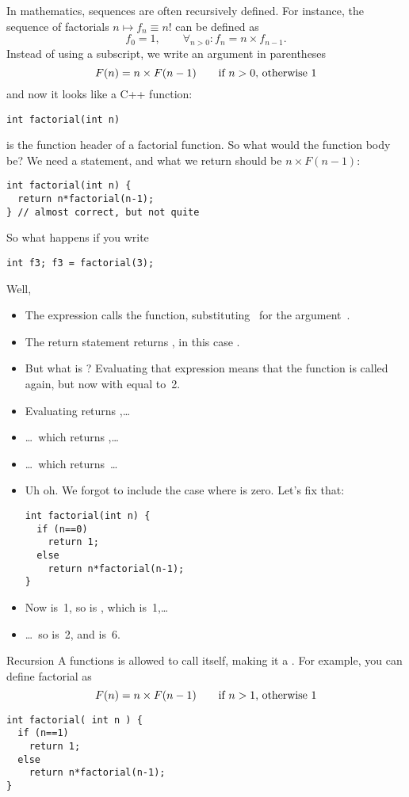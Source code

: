 In mathematics, sequences are often recursively defined. For instance,
the sequence of factorials $n\mapsto f_n\equiv n!$ can be defined as
\[ f_0=1,\qquad \forall_{n>0}\colon f_n=n\times f_{n-1}. \]
Instead of using a subscript, we write an argument in parentheses
\[ F(n) = n \times F(n-1) \qquad \hbox{if $n>0$, otherwise~$1$} \]
and now it looks like a C++ function:
\begin{verbatim}
int factorial(int n)
\end{verbatim}
is the function header of a factorial function. So what would the
function body be? We need a  statement, and what we return
should be $n \times F(n-1)$:
\begin{verbatim}
int factorial(int n) {
  return n*factorial(n-1);
} // almost correct, but not quite
\end{verbatim}
So what happens if you write
\begin{verbatim}
int f3; f3 = factorial(3);
\end{verbatim}
Well,
\begin{itemize}
\item The expression  calls the 
  function, substituting~ for the argument~.
\item The return statement returns , in this case
  .
\item But what is ? Evaluating that expression means
  that the  function is called again, but now with 
  equal to~2.
\item Evaluating  returns ,\ldots
\item \ldots~which returns ,\ldots
\item \ldots~which returns~\ldots
\item Uh oh. We forgot to include the case where  is zero. Let's
  fix that:
\begin{verbatim}
int factorial(int n) {
  if (n==0)
    return 1;
  else
    return n*factorial(n-1);
}
\end{verbatim}
\item Now  is~1, so  is
  , which is~1,\ldots
\item \ldots~so  is~2, and  is~6.
\end{itemize}

\begin{slide}{Recursion}
  \label{sl:func-recur}
  A functions is allowed to call itself, making it a .
  For example, you can define factorial as
  \[ F(n) = n \times F(n-1) \qquad \hbox{if $n>1$, otherwise~$1$} \]
\begin{verbatim}
int factorial( int n ) {
  if (n==1)
    return 1;
  else
    return n*factorial(n-1);
}
\end{verbatim}
\end{slide}


